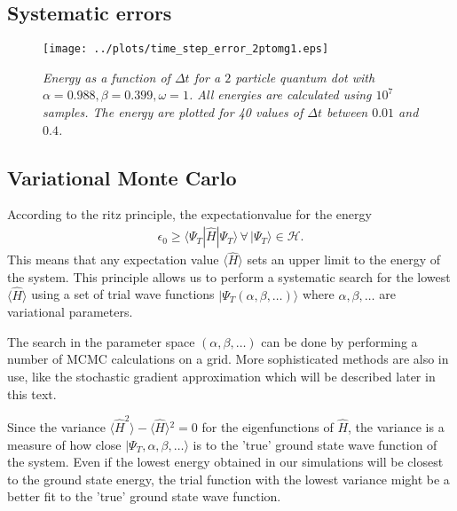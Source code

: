 \documentclass[a4paper,10pt,twocolumn]{article} %
\newcommand{\bra}[1]{\langle{#1}|}
\newcommand{\ket}[1]{|#1\rangle{}}
\newcommand{\expec}[1]{\langle{}{#1}\rangle{}}
\begin{document}


\subsection{Systematic errors}
\begin{figure}[h!]
\begin{center}
\caption{{\it%
			Energy as a function of $\Delta t$ for a $2$ particle quantum dot with $\alpha=0.988,\beta=0.399,\omega=1$. All energies are calculated using $10^7$ samples.
			The energy are plotted for 40 values of $\Delta t$ between $0.01$ and $0.4$. 
		}}
		\label{figblc}
	\texttt{[image: ../plots/time\_step\_error\_2ptomg1.eps]}
\end{center}
\end{figure}

\subsection{Variational Monte Carlo}%

According to the ritz principle, the expectationvalue for the energy 
\begin{align}
	\epsilon_0\ge\bra{\Psi_T} \hat H \ket{\Psi_T}\,\forall\,\ket{\Psi_T}\in\mathcal H.
\end{align} 
%
This means that any expectation value $\expec{\hat H}$ sets an upper limit to the energy of the system. 
%
This principle allows us to perform a systematic search for the lowest $\expec{\hat H}$ using a set of trial wave functions 
$\ket{\Psi_T(\alpha,\beta,\dots)}$ where $\alpha,\beta,\dots$ are variational parameters. %

The search in the parameter space $(\alpha,\beta, \dots)$ can be done by performing a number of MCMC calculations on a grid. 
More sophisticated methods are also in use, like the stochastic gradient approximation which will be described later in this text.

Since the variance $\expec{\hat H^2}-\expec{\hat H}^2=0$ for the eigenfunctions of $\hat H$, the variance is a measure of how close 
$\ket{\Psi_T,\alpha,\beta,\dots}$ is to the 'true' ground state wave function of the system. Even if the lowest energy obtained in our simulations will be closest 
to the ground state energy, the trial function with the lowest variance might be a better fit to the 'true' ground state wave function. 
\end{document}
